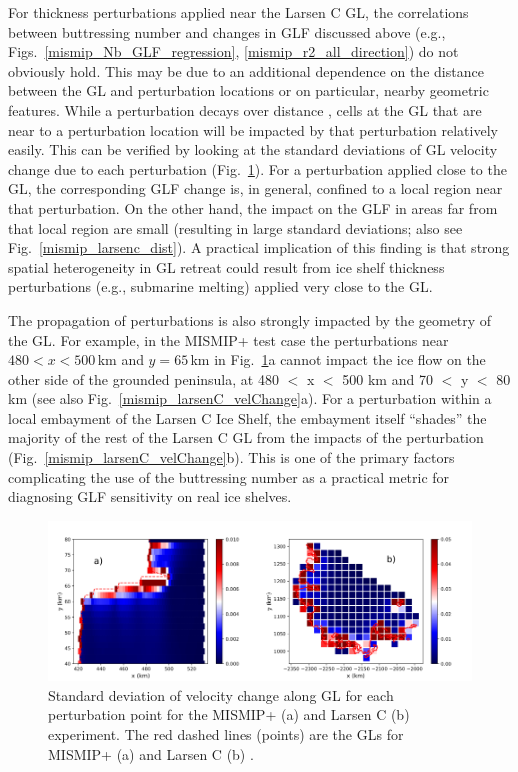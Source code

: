 \documentclass[review,oneside]{igs}
\begin{document}
For thickness perturbations applied near the Larsen C GL, the correlations between buttressing number and changes in GLF discussed above (e.g., Figs.~\ref{mismip_Nb_GLF_regression}, \ref{mismip_r2_all_direction}) do not obviously hold. This may be due to an additional dependence on the distance between the GL and perturbation locations or on particular, nearby geometric features. While a perturbation decays over distance \citep{lick1970}, cells at the GL  that are near to a perturbation location will be impacted by that perturbation relatively easily. This can be verified by looking at the standard deviations of GL velocity change due to each perturbation (Fig.~\ref{vel_change_std}). For a perturbation applied close to the GL, the corresponding GLF change is, in general, confined to a local region near that perturbation. On the other hand, the impact on the GLF in areas far from that local region are small (resulting in large standard deviations; also see Fig.~\ref{mismip_larsenc_dist}). A practical implication of this finding is that strong spatial heterogeneity in GL retreat could result from ice shelf thickness perturbations (e.g., submarine melting) applied very close to the GL. 

The propagation of perturbations is also strongly impacted by the geometry of the GL. For example, in the MISMIP+ test case the perturbations near $480 < x < 500$\,km and $y = 65$\,km in Fig.~\ref{vel_change_std}a cannot impact the ice flow on the other side of the grounded peninsula, at 480 $<$ x $<$ 500 km and 70 $<$ y $<$ 80 km (see also Fig.~\ref{mismip_larsenC_velChange}a). For a perturbation within a local embayment of the Larsen C Ice Shelf, the embayment itself ``shades'' the majority of the rest of the Larsen C GL from the impacts of the perturbation (Fig.~\ref{mismip_larsenC_velChange}b). This is one of the primary factors complicating the use of the buttressing number as a practical metric for diagnosing GLF sensitivity on  real ice shelves.
 
\begin{figure}
	\centering
    \includegraphics[width=1\linewidth]{figs/vel_change_std.pdf}
    \caption{Standard deviation of velocity change along GL for each perturbation point for the MISMIP+ (a) and Larsen C (b) experiment. The red dashed lines (points) are the GLs for MISMIP+ (a) and Larsen C (b) .}
	\label{vel_change_std}
\end{figure}
\end{document}
